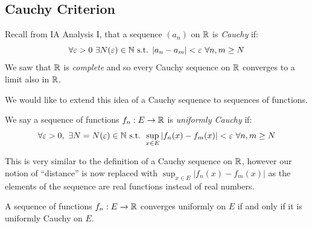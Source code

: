 \documentclass[../main.tex]{subfiles}
\begin{document}
\subsection{Cauchy Criterion}
\begin{remark}[Recap]
  Recall from IA Analysis I, that a sequence $(a_n)$ on $\mathbb{R}$ is \textit{Cauchy} if:
  \[
    \forall \varepsilon > 0\ \exists N(\varepsilon) \in \N \text{ s.t. } |a_n - a_m| < \varepsilon\ \forall n, m \geq N
  \]
  We saw that $\mathbb{R}$ is \textit{complete} and so every Cauchy sequence on $\mathbb{R}$ converges to a limit also in $\mathbb{R}$.
\end{remark}
We would like to extend this idea of a Cauchy sequence to sequences of functions.
\begin{definition}
  We say a sequence of functions $f_n: E \to \mathbb{R}$ is \textit{uniformly Cauchy} if:
  \[
    \forall \varepsilon > 0,\ \exists N = N(\varepsilon) \in \mathbb{N} \text{ s.t. } \sup_{x \in E} |f_n(x) - f_m(x)| < \varepsilon\ \forall n, m \geq N
  \]
\end{definition}
\begin{remark}
  This is very similar to the definition of a Cauchy sequence on $\mathbb{R}$, however our notion of ``distance'' is now replaced with $\sup_{x \in E} |f_n(x) - f_m(x)|$ as the elements of the sequence are real functions instead of real numbers.
\end{remark}
\begin{theorem}
  A sequence of functions $f_n: E \to \mathbb{R}$ converges uniformly on $E$ if and only if it is uniformly Cauchy on $E$. \label{cauchyCritereon}
\end{theorem}
\end{document}
